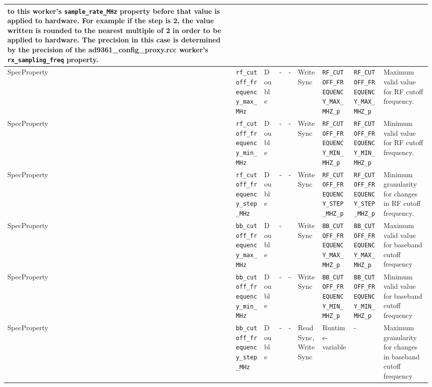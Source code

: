 \documentclass{article}
\begin{document}
\begin{landscape}
\begin{scriptsize}
\begin{longtable}{|p{1.8cm}|p{4.1cm}|p{1cm}|c|c|p{1.6cm}|p{3.7cm}|p{3.7cm}|p{2.5cm}|}
        to this worker's \verb+sample_rate_MHz+ property
        before that value is applied to hardware. For example if the step is 2,
        the value written is rounded to the nearest multiple of 2 in order to
        be applied to hardware. The precision in this case is determined by the
        precision of the ad9361\_config\_proxy.rcc worker's
        \verb+rx_sampling_freq+ property.                                                                                                                                                                              \\
			\hline
			SpecProperty & \verb+rf_cutoff_frequency_max_MHz+  & Double& -        & -          & WriteSync      & \verb+RF_CUTOFF_FREQUENCY_MAX_MHZ_p+ & \verb+RF_CUTOFF_FREQUENCY_MAX_MHZ_p+ & Maximum valid value for RF cutoff frequency. \\
			\hline
			SpecProperty & \verb+rf_cutoff_frequency_min_MHz+  & Double& -        & -          & WriteSync      & \verb+RF_CUTOFF_FREQUENCY_MIN_MHZ_p+ & \verb+RF_CUTOFF_FREQUENCY_MIN_MHZ_p+  & Minimum valid value for RF cutoff frequency. \\
			\hline
			SpecProperty & \verb+rf_cutoff_frequency_step_MHz+ & Double& -        & -          & WriteSync      & \verb+RF_CUTOFF_FREQUENCY_STEP_MHZ_p+ & \verb+RF_CUTOFF_FREQUENCY_STEP_MHZ_p+ & Minimum granularity for changes in RF cutoff frequency. \\
			\hline
			SpecProperty & \verb+bb_cutoff_frequency_max_MHz+  & Double& -        & & WriteSync      & \verb+BB_CUTOFF_FREQUENCY_MAX_MHZ_p+ & \verb+BB_CUTOFF_FREQUENCY_MAX_MHZ_p+ & Maximum valid value for baseband cutoff frequency                                                                                                                                                                           \\
			\hline
			SpecProperty & \verb+bb_cutoff_frequency_min_MHz+  & Double& -        & -          & WriteSync      & \verb+BB_CUTOFF_FREQUENCY_MIN_MHZ_p+ & \verb+BB_CUTOFF_FREQUENCY_MIN_MHZ_p+ & Minimum valid value for baseband cutoff frequency                                                                                                                                                                           \\
			\hline
			SpecProperty & \verb+bb_cutoff_frequency_step_MHz+ & Double& -        & -          & ReadSync, WriteSync & Runtime-variable & - & Maximum granularity for changes in baseband cutoff frequency                                                                                                                                                                \\

\end{longtable}
\end{scriptsize}
\end{landscape}
\end{document}
